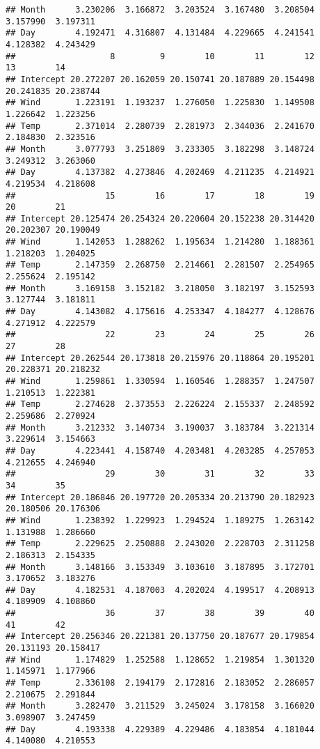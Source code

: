 \documentclass[
]{article}
\begin{document}
\begin{verbatim}
## Month      3.230206  3.166872  3.203524  3.167480  3.208504  3.157990  3.197311
## Day        4.192471  4.316807  4.131484  4.229665  4.241541  4.128382  4.243429
##                   8         9        10        11        12        13        14
## Intercept 20.272207 20.162059 20.150741 20.187889 20.154498 20.241835 20.238744
## Wind       1.223191  1.193237  1.276050  1.225830  1.149508  1.226642  1.223256
## Temp       2.371014  2.280739  2.281973  2.344036  2.241670  2.184830  2.323516
## Month      3.077793  3.251809  3.233305  3.182298  3.148724  3.249312  3.263060
## Day        4.137382  4.273846  4.202469  4.211235  4.214921  4.219534  4.218608
##                  15        16        17        18        19        20        21
## Intercept 20.125474 20.254324 20.220604 20.152238 20.314420 20.202307 20.190049
## Wind       1.142053  1.288262  1.195634  1.214280  1.188361  1.218203  1.204025
## Temp       2.147359  2.268750  2.214661  2.281507  2.254965  2.255624  2.195142
## Month      3.169158  3.152182  3.218050  3.182197  3.152593  3.127744  3.181811
## Day        4.143082  4.175616  4.253347  4.184277  4.128676  4.271912  4.222579
##                  22        23        24        25        26        27        28
## Intercept 20.262544 20.173818 20.215976 20.118864 20.195201 20.228371 20.218232
## Wind       1.259861  1.330594  1.160546  1.288357  1.247507  1.210513  1.222381
## Temp       2.274628  2.373553  2.226224  2.155337  2.248592  2.259686  2.270924
## Month      3.212332  3.140734  3.190037  3.183784  3.221314  3.229614  3.154663
## Day        4.223441  4.158740  4.203481  4.203285  4.257053  4.212655  4.246940
##                  29        30        31        32        33        34        35
## Intercept 20.186846 20.197720 20.205334 20.213790 20.182923 20.180506 20.176306
## Wind       1.238392  1.229923  1.294524  1.189275  1.263142  1.131988  1.286660
## Temp       2.229625  2.250888  2.243020  2.228703  2.311258  2.186313  2.154335
## Month      3.148166  3.153349  3.103610  3.187895  3.172701  3.170652  3.183276
## Day        4.182531  4.187003  4.202024  4.199517  4.208913  4.189909  4.108860
##                  36        37        38        39        40        41        42
## Intercept 20.256346 20.221381 20.137750 20.187677 20.179854 20.131193 20.158417
## Wind       1.174829  1.252588  1.128652  1.219854  1.301320  1.145971  1.177966
## Temp       2.336108  2.194179  2.172816  2.183052  2.286057  2.210675  2.291844
## Month      3.282470  3.211529  3.245024  3.178158  3.166020  3.098907  3.247459
## Day        4.193338  4.229389  4.229486  4.183854  4.181044  4.140080  4.210553

\end{verbatim}
\end{document}
